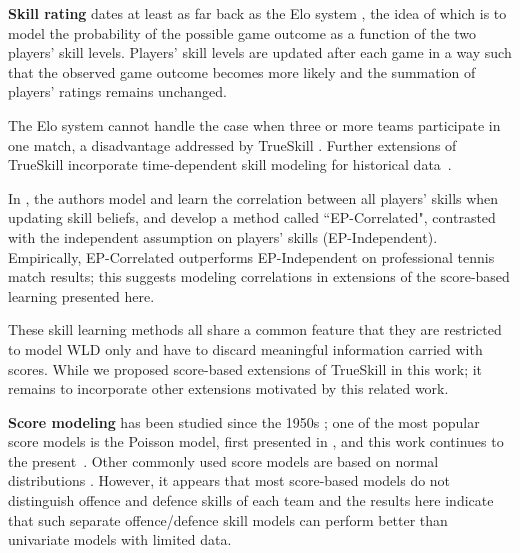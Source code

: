 {\bf Skill rating} dates at least as far back as the Elo system
\cite{elo78TheRatingOfChessPlayers}, the idea of which is to model the
probability of the possible game outcome as a function of the two
players' skill levels. Players' skill levels are updated after each
game in a way such that the observed game outcome becomes more likely
and the summation of players' ratings remains unchanged.

The Elo system cannot handle the case when three or more teams
participate in one match, a disadvantage addressed by TrueSkill
\cite{herbrich06569}. %
Further extensions of TrueSkill incorporate time-dependent
skill modeling for historical data~\cite{dangauthier07337}.


In \cite{birlutiu07ExpectationPropagation}, the authors model and learn the
correlation between all players' skills when updating skill beliefs, and
develop a method called ``EP-Correlated", contrasted with the
independent assumption on players' skills
(EP-Independent).  Empirically, EP-Correlated outperforms
EP-Independent on professional tennis match results;
this suggests modeling correlations in extensions of the
score-based learning presented here.

These skill learning methods all share a common feature that they are
restricted to model WLD only and have to discard meaningful
information carried with scores.  While we proposed score-based extensions
of TrueSkill in this work; it remains to incorporate other extensions
motivated by this related work.

{\bf Score modeling} has been studied since the 1950s
\cite{Moroney56FactsFromFigures}
\cite{dixon97ModellingAssociationFootball} \cite{Glickman98JASA}
\cite{Karlis03AnalysisOfSportsData}
\cite{karlis09BayesianModellingFootballOutcomes}; one of the most
popular score models is the Poisson model, first presented in
\cite{Moroney56FactsFromFigures}, and this work continues to the
present~\cite{karlis09BayesianModellingFootballOutcomes}. Other
commonly used score models are based on normal distributions
\cite{Glickman98JASA}. However, it appears that most score-based
models do not distinguish offence and defence skills of each team and
the results here indicate that such separate offence/defence skill
models can perform better than univariate models with limited data.

